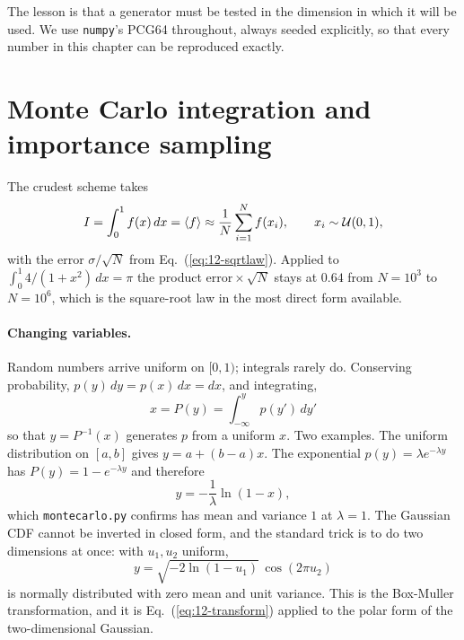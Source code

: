 The lesson is that a generator must be tested in the dimension in which it
will be used.  We use \texttt{numpy}'s PCG64 throughout, always seeded
explicitly, so that every number in this chapter can be reproduced exactly.

\section{Monte Carlo integration and importance sampling}
\label{sec:mcintegration}

The crudest scheme takes
\begin{equation}
  I = \int_0^1 f(x)\,dx = \langle f \rangle
   \approx \frac{1}{N}\sum_{i=1}^{N}f(x_i),
  \qquad x_i \sim \mathcal{U}(0,1),
  \label{eq:12-bruteforce}
\end{equation}
with the error $\sigma/\sqrt{N}$ from Eq.~(\ref{eq:12-sqrtlaw}).  Applied to
$\int_0^1 4/(1+x^2)\,dx=\pi$ the product $\text{error}\times\sqrt{N}$ stays at
$0.64$ from $N=10^3$ to $N=10^6$, which is the square-root law in the most
direct form available.

\paragraph{Changing variables.}
Random numbers arrive uniform on $[0,1)$; integrals rarely do.  Conserving
probability, $p(y)\,dy = p(x)\,dx = dx$, and integrating,
\begin{equation}
  \boxed{\; x = P(y) = \int_{-\infty}^{y}p(y')\,dy' \;}
  \label{eq:12-inversecdf}
\end{equation}
so that $y=P^{-1}(x)$ generates $p$ from a uniform $x$.  Two examples.  The
uniform distribution on $[a,b]$ gives $y=a+(b-a)x$.  The exponential
$p(y)=\lambda e^{-\lambda y}$ has $P(y)=1-e^{-\lambda y}$ and therefore
\begin{equation}
  y = -\frac{1}{\lambda}\ln(1-x),
  \label{eq:12-exponentialsample}
\end{equation}
which \texttt{montecarlo.py} confirms has mean and variance $1$ at
$\lambda=1$.  The Gaussian CDF cannot be inverted in closed form, and the
standard trick is to do two dimensions at once: with $u_1,u_2$ uniform,
\begin{equation}
  y = \sqrt{-2\ln(1-u_1)}\,\cos(2\pi u_2)
  \label{eq:12-boxmuller}
\end{equation}
is normally distributed with zero mean and unit variance.  This is the
Box-Muller transformation, and it is Eq.~(\ref{eq:12-transform}) applied to
the polar form of the two-dimensional Gaussian.

